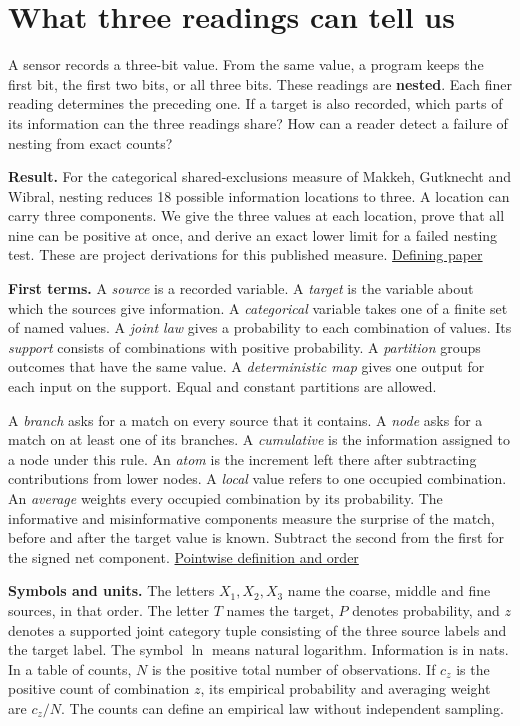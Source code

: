 \section{What three readings can tell us}\label{what-three-readings-can-tell-us}

A sensor records a three-bit value. From the same value, a program keeps the first bit, the first two bits, or all three bits. These readings are \textbf{nested}. Each finer reading determines the preceding one. If a target is also recorded, which parts of its information can the three readings share? How can a reader detect a failure of nesting from exact counts?

\textbf{Result.} For the categorical shared-exclusions measure of Makkeh, Gutknecht and Wibral, nesting reduces 18 possible information locations to three. A location can carry three components. We give the three values at each location, prove that all nine can be positive at once, and derive an exact lower limit for a failed nesting test. These are project derivations for this published measure. \href{https://doi.org/10.1103/PhysRevE.103.032149}{Defining paper}

\textbf{First terms.} A \emph{source} is a recorded variable. A \emph{target} is the variable about which the sources give information. A \emph{categorical} variable takes one of a finite set of named values. A \emph{joint law} gives a probability to each combination of values. Its \emph{support} consists of combinations with positive probability. A \emph{partition} groups outcomes that have the same value. A \emph{deterministic map} gives one output for each input on the support. Equal and constant partitions are allowed.

A \emph{branch} asks for a match on every source that it contains. A \emph{node} asks for a match on at least one of its branches. A \emph{cumulative} is the information assigned to a node under this rule. An \emph{atom} is the increment left there after subtracting contributions from lower nodes. A \emph{local} value refers to one occupied combination. An \emph{average} weights every occupied combination by its probability. The informative and misinformative components measure the surprise of the match, before and after the target value is known. Subtract the second from the first for the signed net component. \href{https://arxiv.org/abs/2002.03356v5}{Pointwise definition and order}

\textbf{Symbols and units.} The letters \(X_1,X_2,X_3\) name the coarse, middle and fine sources, in that order. The letter \(T\) names the target, \(P\) denotes probability, and \(z\) denotes a supported joint category tuple consisting of the three source labels and the target label. The symbol \(\ln\) means natural logarithm. Information is in nats. In a table of counts, \(N\) is the positive total number of observations. If \(c_z\) is the positive count of combination \(z\), its empirical probability and averaging weight are \(c_z/N\). The counts can define an empirical law without independent sampling.

